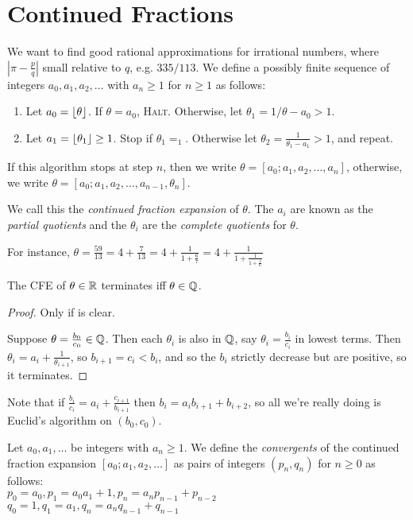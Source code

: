 \documentclass[10pt,a4paper]{article}
\begin{document}
\section{Continued Fractions}
We want to find good rational approximations for irrational numbers, where $|\pi - \frac{p}{q}|$ small relative to $q$, e.g. $335/113$. We define a possibly finite sequence of integers $a_0, a_1, a_2, \ldots$ with $a_n \geq 1$ for $n \geq 1$ as follows:
\begin{enumerate}
\item Let $a_0 = \lfloor \theta \rfloor$. If $\theta = a_0$, \textsc{Halt}. Otherwise, let $\theta_1 = 1/{\theta - a_0} > 1$.
\item Let $a_1 = \lfloor \theta_1 \rfloor \geq 1$. Stop if $\theta_1 = _1$. Otherwise let $\theta_2 = \frac{1}{\theta_1 - a_1} > 1$, and repeat.
\end{enumerate}
If this algorithm stops at step $n$, then we write $\theta = [a_0;a_1,a_2,\ldots, a_n]$, otherwise, we write $\theta = [a_0;a_1,a_2,\ldots,a_{n-1},\theta_n]$.

We call this the \emph{continued fraction expansion} of $\theta$. The $a_i$ are known as the \emph{partial quotients} and the $\theta_i$ are the \emph{complete quotients} for $\theta$.

For instance, $\theta = \frac{59}{13} = 4 + \frac{7}{13} = 4 + \frac{1}{1+\frac{6}{7}} = 4  + \frac{1}{1+\frac{1}{1+\frac{1}{6}}}$

\begin{proposition}
The CFE of $\theta \in \mathbb{R}$ terminates iff $\theta \in \mathbb{Q}$.
\end{proposition}
\begin{proof}
Only if is clear.

Suppose $\theta = \frac{b_0}{c_0} \in \mathbb{Q}$. Then each $\theta_i$ is also in $\mathbb{Q}$, say $\theta_i = \frac{b_i}{c_i}$ in lowest terms. Then $\theta_i = a_i + \frac{1}{\theta_{i+1}}$, so $b_{i+1} = c_i < b_i$, and so the $b_i$ strictly decrease but are positive, so it terminates.
\end{proof}
Note that if $\frac{b_i}{c_i} = a_i + \frac{c_{i+1}}{b_{i+1}}$ then $b_i = a_ib_{i+1} + b_{i+2}$, so all we're really doing is Euclid's algorithm on $(b_0, c_0)$.

Let $a_0, a_1, \ldots$ be integers with $a_n \geq 1$. We define the \emph{convergents} of the continued fraction expansion $[a_0;a_1,a_2,\ldots]$ as pairs of integers $(p_n, q_n)$ for $n\geq 0$ as follows:\\
$p_0 = a_0, p_1 = a_0a_1 +1, p_n = a_np_{n-1} + p_{n-2}$\\
$q_0 = 1, q_1 = a_1, q_n = a_nq_{n-1} + q_{n-1}$
\end{document}

